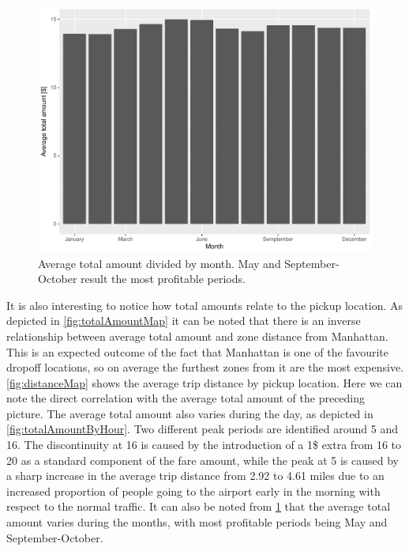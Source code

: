 \documentclass{acm_proc_article-sp-sigmod09}
\begin{document}
\begin{figure}
	\centering
	\includegraphics[width=1\columnwidth]{resources/base_plots/avg_total_amount_by_month.pdf}
	\caption{Average total amount divided by month. May and September-October result the most profitable periods.}
	\label{fig:totalAmountByMonth}
\end{figure}

It is also interesting to notice how total amounts relate to the pickup location. As depicted in \cref{fig:totalAmountMap} it can be noted that there is an inverse relationship between average total amount and zone distance from Manhattan. This is an expected outcome of the fact that Manhattan is one of the favourite dropoff locations, so on average the furthest zones from it are the most expensive. \cref{fig:distanceMap} shows the average trip distance by pickup location. Here we can note the direct correlation with the average total amount of the preceding picture. The average total amount also varies during the day, as depicted in \cref{fig:totalAmountByHour}. Two different peak periods are identified around 5 and 16. The discontinuity at 16 is caused by the introduction of a 1\$ extra from 16 to 20 as a standard component of the fare amount, while the peak at 5 is caused by a sharp increase in the average trip distance from 2.92 to 4.61 miles due to an increased proportion of people going to the airport early in the morning with respect to the normal traffic. It can also be noted from \cref{fig:totalAmountByMonth} that the average total amount varies during the months, with most profitable periods being May and September-October.
\end{document}
